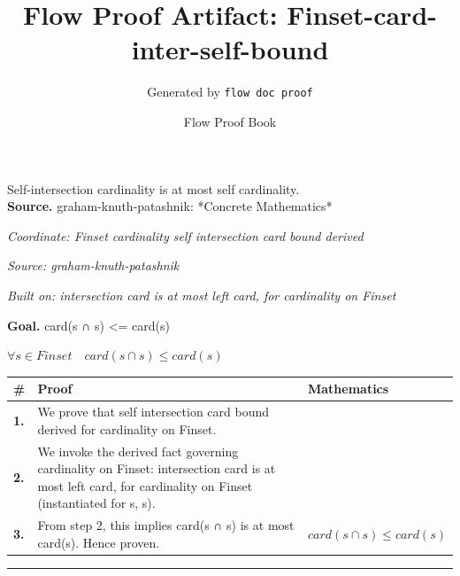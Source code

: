 \documentclass[11pt]{article}
\title{Flow Proof Artifact: Finset-card-inter-self-bound}
\author{Generated by \texttt{flow doc proof}}
\date{Flow Proof Book}
\theoremstyle{definition}
\begin{document}
\maketitle
Self-intersection cardinality is at most self cardinality.\\[0.5em]
\textbf{Source.} graham-knuth-patashnik: *Concrete Mathematics*\\[0.5em]
\bigskip
{}\par
\smallskip\noindent\textit{Coordinate: Finset \cdot cardinality \cdot self intersection card bound derived}\par
\smallskip\noindent\textit{Source: graham-knuth-patashnik}\par
\smallskip\noindent\textit{Built on: intersection card is at most left card, for cardinality on Finset}\par
\medskip
\noindent\textbf{Goal.} card(s ∩ s) <= card(s)\par
\noindent$\displaystyle \forall s \in Finset\quad card(s ∩ s) \le card(s)$\par
\medskip
\noindent
\begin{tabular}{@{} >{\raggedright\arraybackslash}p{} >{\raggedright\arraybackslash}p{} >{\raggedleft\arraybackslash}p{} @{}}
\textbf{\#} & \textbf{Proof} & \textbf{Mathematics} \\
\midrule
\textbf{1.} & We prove that self intersection card bound derived for cardinality on Finset. & \\[0.45em]
\textbf{2.} & We invoke the derived fact governing cardinality on Finset: intersection card is at most left card, for cardinality on Finset (instantiated for s, s). & \\[0.45em]
\textbf{3.} & From step 2, this implies card(s ∩ s) is at most card(s). Hence proven. & $\displaystyle card(s ∩ s) \le card(s)$ \\[0.45em]
\bottomrule
\end{tabular}
\label{thm:Finset-cardinality-self_intersection_card_bound_derived}
\par\medskip\hrule
\end{document}
